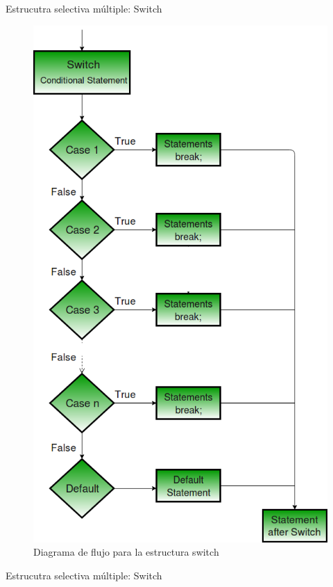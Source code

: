 \documentclass[xcolor=pdftex,table,11pt]{beamer}
\begin{document}
\begin{frame}{Estrucutra selectiva múltiple: Switch}

\begin{figure}

\includegraphics[scale=0.201]{../img/exported/switch.png}
\caption{Diagrama de flujo para la estructura switch}
\end{figure}
\end{frame}


\begin{frame}{Estrucutra selectiva múltiple: Switch}
\codesetstylefrombeamer
{}
\end{frame}
\end{document}
